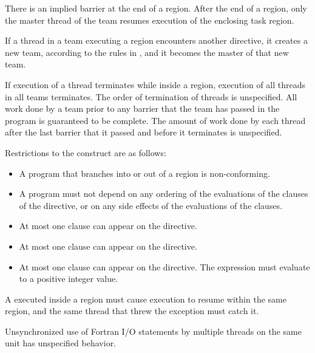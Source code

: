 There is an implied barrier at the end of a  region. After the end of a 
 region, only the master thread of the team resumes execution of the 
enclosing task region.

If a thread in a team executing a  region encounters another  
directive, it creates a new team, according to the rules in 
, 
and it becomes the master of that new team.

If execution of a thread terminates while inside a  region, execution of all 
threads in all teams terminates. The order of termination of threads is unspecified. All 
work done by a team prior to any barrier that the team has passed in the program is 
guaranteed to be complete. The amount of work done by each thread after the last 
barrier that it passed and before it terminates is unspecified.

\restrictions
Restrictions to the  construct are as follows:

\begin{itemize}
\item A program that branches into or out of a  region is non-conforming.

\item A program must not depend on any ordering of the evaluations of the clauses of the 
 directive, or on any side effects of the evaluations of the clauses.

\item At most one  clause can appear on the directive.

\item At most one  clause can appear on the directive.

\item At most one  clause can appear on the directive. The  
expression must evaluate to a positive integer value.
\end{itemize}

\ccppspecificstart
A  executed inside a  region must cause execution to resume 
within the same  region, and the same thread that threw the exception 
must catch it.
\ccppspecificend

\fortranspecificstart
Unsynchronized use of Fortran I/O statements by multiple threads on the same unit 
has unspecified behavior.
\fortranspecificend

